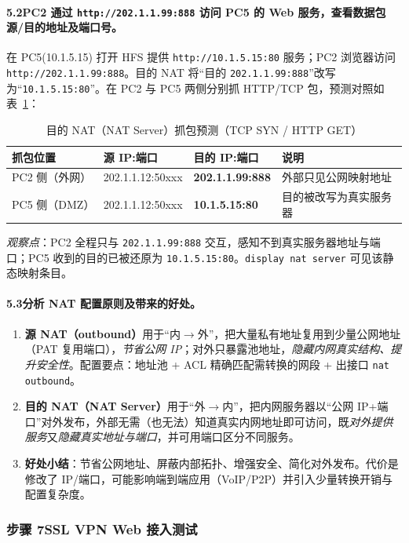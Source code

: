 \documentclass[12pt,a4paper]{article}
\begin{document}
\paragraph{5.2\quad PC2 通过 \texttt{http://202.1.1.99:888} 访问 PC5 的 Web 服务，查看数据包源/目的地址及端口号。}
在 PC5(10.1.5.15) 打开 HFS 提供 \texttt{http://10.1.5.15:80} 服务；PC2 浏览器访问 \texttt{http://202.1.1.99:888}。目的 NAT 将“目的 \texttt{202.1.1.99:888}”改写为“\texttt{10.1.5.15:80}”。在 PC2 与 PC5 两侧分别抓 HTTP/TCP 包，预测对照如表~\ref{tab:natdnat}：
\begin{table}[H]
\centering\caption{目的 NAT（NAT Server）抓包预测（TCP SYN / HTTP GET）}\label{tab:natdnat}
\small
\begin{tabular}{@{}llll@{}}
\toprule
抓包位置 & 源 IP:端口 & 目的 IP:端口 & 说明 \\
\midrule
PC2 侧（外网） & 202.1.1.12:50xxx & \textbf{202.1.1.99:888} & 外部只见公网映射地址 \\
PC5 侧（DMZ） & 202.1.1.12:50xxx & \textbf{10.1.5.15:80} & 目的被改写为真实服务器 \\
\bottomrule
\end{tabular}
\end{table}
\emph{观察点}：PC2 全程只与 \texttt{202.1.1.99:888} 交互，感知不到真实服务器地址与端口；PC5 收到的目的已被还原为 \texttt{10.1.5.15:80}。\texttt{display nat server} 可见该静态映射条目。

\paragraph{5.3\quad 分析 NAT 配置原则及带来的好处。}
\begin{enumerate}[leftmargin=1.8em]
  \item \textbf{源 NAT（outbound）}用于“内$\to$外”，把大量私有地址复用到少量公网地址（PAT 复用端口），\emph{节省公网 IP}；对外只暴露池地址，\emph{隐藏内网真实结构、提升安全性}。配置要点：地址池 + ACL 精确匹配需转换的网段 + 出接口 \texttt{nat outbound}。
  \item \textbf{目的 NAT（NAT Server）}用于“外$\to$内”，把内网服务器以“公网 IP+端口”对外发布，外部无需（也无法）知道真实内网地址即可访问，既\emph{对外提供服务}又\emph{隐藏真实地址与端口}，并可用端口区分不同服务。
  \item \textbf{好处小结}：节省公网地址、屏蔽内部拓扑、增强安全、简化对外发布。代价是修改了 IP/端口，可能影响端到端应用（VoIP/P2P）并引入少量转换开销与配置复杂度。
\end{enumerate}

\subsubsection*{步骤 7\quad SSL VPN Web 接入测试}
\end{document}
